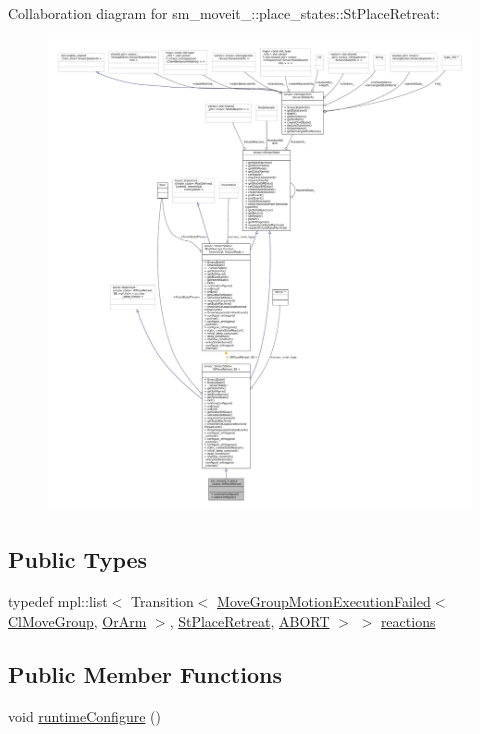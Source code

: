 Collaboration diagram for sm\+\_\+moveit\+\_\+:\+:place\+\_\+states\+:\+:St\+Place\+Retreat\+:
\nopagebreak
\begin{figure}[H]
\begin{center}
\leavevmode
\includegraphics[width=350pt]{structsm__moveit__3_1_1place__states_1_1StPlaceRetreat__coll__graph}
\end{center}
\end{figure}
\subsection*{Public Types}
\begin{DoxyCompactItemize}
\item 
typedef mpl\+::list$<$ Transition$<$ \hyperlink{structmove__group__interface__client_1_1MoveGroupMotionExecutionFailed}{Move\+Group\+Motion\+Execution\+Failed}$<$ \hyperlink{classmove__group__interface__client_1_1ClMoveGroup}{Cl\+Move\+Group}, \hyperlink{classsm__moveit__3_1_1OrArm}{Or\+Arm} $>$, \hyperlink{structsm__moveit__3_1_1place__states_1_1StPlaceRetreat}{St\+Place\+Retreat}, \hyperlink{classABORT}{A\+B\+O\+RT} $>$ $>$ \hyperlink{structsm__moveit__3_1_1place__states_1_1StPlaceRetreat_a92636e607d6e62e4c2caf20ba9601fd1}{reactions}
\end{DoxyCompactItemize}
\subsection*{Public Member Functions}
\begin{DoxyCompactItemize}
\item 
void \hyperlink{structsm__moveit__3_1_1place__states_1_1StPlaceRetreat_a47d0fe7bd6b1983682b143160b59a3c1}{runtime\+Configure} ()
\end{DoxyCompactItemize}
